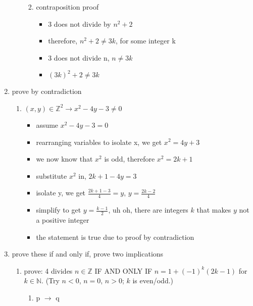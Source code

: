 \documentclass[12pt]{article}
\begin{document}
\begin{enumerate}
\begin{enumerate}
\begin{enumerate}
\begin{itemize}
                \end{itemize}
                \item contraposition proof
                \begin{itemize}
                    \item 3 does not divide by $n^2 + 2$
                    \item therefore, $n^2 + 2 \neq 3k$, for some integer k
                    \item 3 does not divide n, $n \neq 3k$
                    \item $(3k)^2 + 2 \neq 3k$
                \end{itemize}
            \end{enumerate}
        \end{enumerate}
        \item prove by contradiction
        \begin{enumerate}
            \item $(x, y) \in \mathbb{Z}^2 \rightarrow x^2 - 4y -3 \neq 0$
            \begin{itemize}
                \item assume $x^2 - 4y - 3 = 0$
                \item rearranging variables to isolate x, we get $x^2 = 4y + 3$
                \item we now know that $x^2$ is odd, therefore $x^2 = 2k+1$
                \item substitute $x^2$ in, $2k + 1 - 4y = 3$
                \item isolate y, we get $\frac{2k + 1 - 3}{4} = y$, $y = \frac{2k-2}{4}$
                \item simplify to get $y = \frac{k - 1}{2}$, uh oh, there are integers $k$ that makes $y$ not a positive integer
                \item the statement is true due to proof by contradiction
            \end{itemize}
        \end{enumerate}
        \item prove these if and only if, prove two implications
        \begin{enumerate}
            \item prove: 4 divides $n \in \mathbb{Z}$ IF AND ONLY IF $n = 1 + (-1)^k(2k-1)$ for $k \in \mathbb{N}$. (Try $n < 0$, $n = 0$, $n > 0$; $k$ is even/odd.)
            \begin{enumerate}
                \item p $\rightarrow$ q

\end{enumerate}
\end{enumerate}
\end{enumerate}
\end{document}
